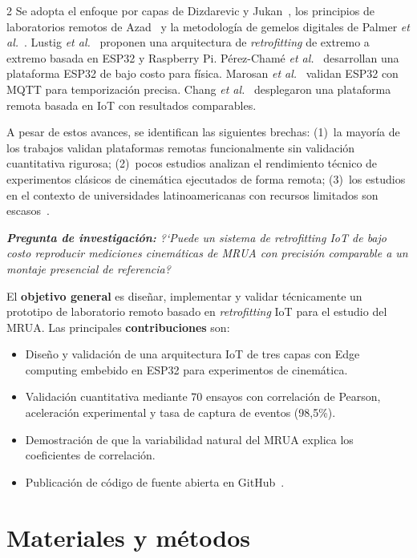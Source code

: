 \documentclass[12pt,twoside,titlepage]{ingenius}
\begin{document}
\begin{multicols}{2}
Se adopta el enfoque por capas de Dizdarevic y Jukan~\cite{r7}, los principios de laboratorios remotos de Azad~\cite{r8} y la metodolog\'ia de gemelos digitales de Palmer \textit{et al.}~\cite{r9}. Lustig \textit{et al.}~\cite{r10} proponen una arquitectura de \textit{retrofitting} de extremo a extremo basada en ESP32 y Raspberry Pi. P\'erez-Cham\'e \textit{et al.}~\cite{r11} desarrollan una plataforma ESP32 de bajo costo para f\'isica. Marosan \textit{et al.}~\cite{r12} validan ESP32 con MQTT para temporizaci\'on precisa. Chang \textit{et al.}~\cite{r52} desplegaron una plataforma remota basada en IoT con resultados comparables.

A pesar de estos avances, se identifican las siguientes brechas: (1)~la mayor\'ia de los trabajos validan plataformas remotas funcionalmente sin validaci\'on cuantitativa rigurosa; (2)~pocos estudios analizan el rendimiento t\'ecnico de experimentos cl\'asicos de cinem\'atica ejecutados de forma remota; (3)~los estudios en el contexto de universidades latinoamericanas con recursos limitados son escasos~\cite{r13,r14}.

\textit{\textbf{Pregunta de investigaci\'on:} ?`Puede un sistema de \textit{retrofitting} IoT de bajo costo reproducir mediciones cinem\'aticas de MRUA con precisi\'on comparable a un montaje presencial de referencia?}

El \textbf{objetivo general} es dise\~nar, implementar y validar t\'ecnicamente un prototipo de laboratorio remoto basado en \textit{retrofitting} IoT para el estudio del MRUA. Las principales \textbf{contribuciones} son:
\begin{itemize}
  \item Dise\~no y validaci\'on de una arquitectura IoT de tres capas con Edge computing embebido en ESP32 para experimentos de cinem\'atica.
  \item Validaci\'on cuantitativa mediante 70 ensayos con correlaci\'on de Pearson, aceleraci\'on experimental y tasa de captura de eventos (98,5\%).
  \item Demostraci\'on de que la variabilidad natural del MRUA explica los coeficientes de correlaci\'on.
  \item Publicaci\'on de c\'odigo de fuente abierta en GitHub~\cite{r15}.
\end{itemize}

\section{Materiales y m\'etodos}


\end{multicols}
\end{document}
